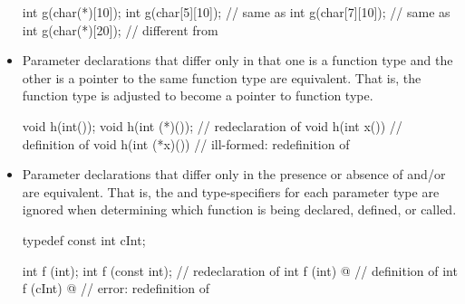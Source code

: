 \begin{note}
\begin{itemize}
\begin{example}
\begin{codeblock}
int g(char(*)[10]);
int g(char[5][10]);             // same as 
int g(char[7][10]);             // same as 
int g(char(*)[20]);             // different from 
\end{codeblock}
\end{example}

\item
{}%
%
Parameter declarations that differ only in that one is a function type
and the other is a pointer to the same function type are equivalent.
That is, the function type is adjusted to become a pointer to function type.
\begin{example}

\begin{codeblock}
void h(int());
void h(int (*)());              // redeclaration of 
void h(int x()) { }             // definition of 
void h(int (*x)()) { }          // ill-formed: redefinition of 
\end{codeblock}
\end{example}

\item
{}%
%
Parameter declarations that differ only in the presence or absence of
and/or
are equivalent.
That is, the
and
type-specifiers for
each parameter type are ignored when determining which function is being
declared,
defined, or called.
\begin{example}
\begin{codeblock}
typedef const int cInt;

int f (int);
int f (const int);              // redeclaration of 
int f (int) { @\commentellip@ }       // definition of 
int f (cInt) { @\commentellip@ }      // error: redefinition of 
\end{codeblock}
\end{example}


\end{itemize}
\end{note}
